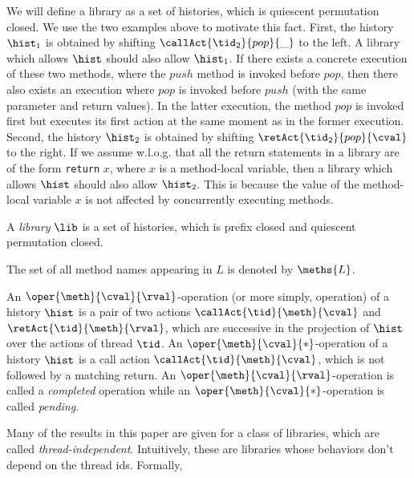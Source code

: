 We will define a library as a set of histories, which is quiescent permutation closed. We use the two examples above to motivate this fact.
First, the history $\hist_1$ is obtained by shifting $\callAct{\tid_2}{pop}{\_}$ to the left. A library %
which allows $\hist$ should also allow $\hist_1$. If there exists a concrete execution of these two methods, where the $push$ method is invoked before $pop$, then there also exists an execution where $pop$ is invoked before $push$ (with the same parameter and return values). In the latter execution, the method $pop$ is invoked first but executes its first action at the same moment as in the former execution.
Second, the history $\hist_2$ is obtained by shifting $\retAct{\tid_2}{pop}{\cval}$ to the right. If we assume w.l.o.g. that all the return statements in a library are of the form {\tt return} $x$, where $x$ is a method-local variable, then a library which allows $\hist$ should also allow $\hist_2$. This is because the value of the method-local variable $x$ is not affected by concurrently executing methods.

\begin{definition}[Library]
A \emph{library} $\lib$ is a set of histories, which is prefix closed and quiescent permutation closed.
\end{definition}


The set of all method names appearing in $L$ is denoted by $\meths{L}$.

An $\oper{\meth}{\cval}{\rval}$-operation (or more simply, operation) of a history $\hist$ is a pair of two actions $\callAct{\tid}{\meth}{\cval}$ and $\retAct{\tid}{\meth}{\rval}$, which are successive in the projection of $\hist$ over the actions of thread $\tid$. An $\oper{\meth}{\cval}{*}$-operation of a history $\hist$ is a call action $\callAct{\tid}{\meth}{\cval}$, which is not followed by a matching return. An $\oper{\meth}{\cval}{\rval}$-operation is called a \emph{completed} operation while an $\oper{\meth}{\cval}{*}$-operation is called \emph{pending}.

Many of the results in this paper are given for a class of libraries, which are called \emph{thread-independent}. Intuitively, these are libraries whose behaviors don't depend on the thread ids. Formally, 

